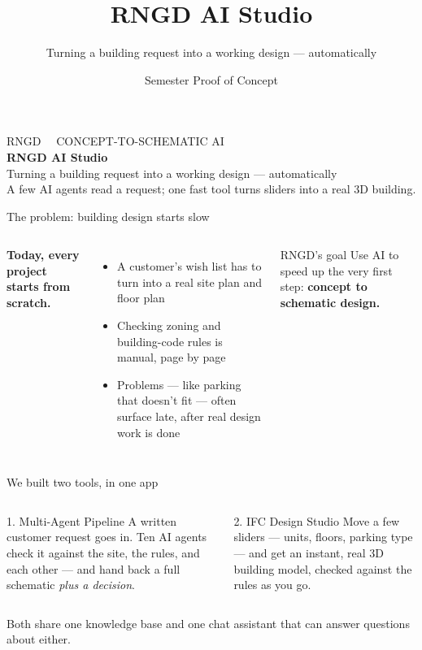 \documentclass[9pt,aspectratio=169]{beamer}
\title{RNGD AI Studio}
\subtitle{Turning a building request into a working design --- automatically}
\author{Semester Proof of Concept}
\date{}
\newcommand{\pill}[2]{{\small\colorbox{#1!15}{\textcolor{#1!70!black}{\strut\,#2\,}}}}
\begin{document}
{%
\begin{frame}[plain]
\begin{center}
\vspace{2.2cm}
{\color{paper!70}\small\ttfamily RNGD \ \textbullet\ CONCEPT-TO-SCHEMATIC AI}\\[0.6cm]
{\color{paper}\Huge\bfseries RNGD AI Studio}\\[0.5cm]
{\color{amber}\Large Turning a building request into a working design --- automatically}\\[1.2cm]
{\color{paper!60}\normalsize A few AI agents read a request; one fast tool turns sliders into a real 3D building.}
\end{center}
\end{frame}
}

\begin{frame}{The problem: building design starts slow}
\begin{columns}[T]
\textbf{Today, every project starts from scratch.}
\begin{itemize}
\item A customer's wish list has to turn into a real site plan and floor plan
\item Checking zoning and building-code rules is manual, page by page
\item Problems --- like parking that doesn't fit --- often surface \alert{late}, after real design work is done
\end{itemize}
\begin{block}{RNGD's goal}
Use AI to speed up the very first step: \textbf{concept to schematic design.}
\end{block}
\end{columns}
\end{frame}

\begin{frame}{We built two tools, in one app}
\begin{columns}[T]
\begin{block}{1. Multi-Agent Pipeline}
A written customer request goes in. Ten AI agents check it against the site, the rules, and each other --- and hand back a full schematic \emph{plus a decision}.
\end{block}
\begin{alertblock}{2. IFC Design Studio \quad\pill{amber}{today's focus}}
Move a few sliders --- units, floors, parking type --- and get an instant, real 3D building model, checked against the rules as you go.
\end{alertblock}
\end{columns}
\vfill
{\small\color{muted} Both share one knowledge base and one chat assistant that can answer questions about either.}
\end{frame}
\end{document}
